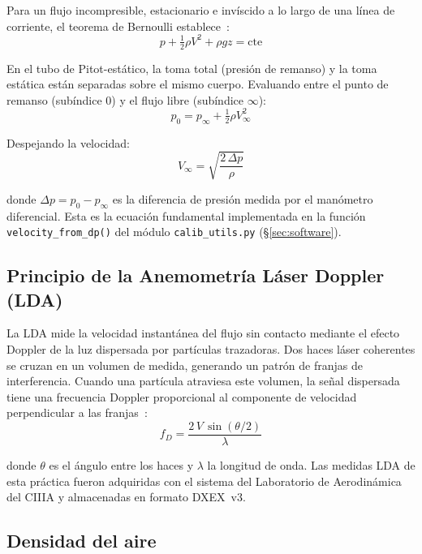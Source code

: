 \documentclass[12pt,a4paper]{article}
\begin{document}
Para un flujo incompresible, estacionario e invíscido a lo largo de una línea
de corriente, el teorema de Bernoulli establece~\cite{anderson2017}:
\begin{equation}
	p + \tfrac{1}{2}\rho V^2 + \rho g z = \text{cte}
	\label{eq:bernoulli}
\end{equation}

En el tubo de Pitot-estático, la toma total (presión de remanso) y la toma
estática están separadas sobre el mismo cuerpo.  Evaluando entre el punto de
remanso (subíndice 0) y el flujo libre (subíndice $\infty$):
\begin{equation}
	p_0 = p_\infty + \tfrac{1}{2}\rho V_\infty^2
	\label{eq:pitot_bernoulli}
\end{equation}

Despejando la velocidad:
\begin{equation}
	\boxed{V_\infty = \sqrt{\frac{2\,\Delta p}{\rho}}}
	\label{eq:V_pitot}
\end{equation}

donde $\Delta p = p_0 - p_\infty$ es la diferencia de presión medida por el
manómetro diferencial.  Esta es la ecuación fundamental implementada en la
función \texttt{velocity\_from\_dp()} del módulo \texttt{calib\_utils.py}
(§\ref{sec:software}).

\subsection{Principio de la Anemometría Láser Doppler (LDA)}

La LDA mide la velocidad instantánea del flujo sin contacto mediante el efecto
Doppler de la luz dispersada por partículas trazadoras.  Dos haces láser
coherentes se cruzan en un volumen de medida, generando un patrón de franjas de
interferencia.  Cuando una partícula atraviesa este volumen, la señal dispersada
tiene una frecuencia Doppler proporcional al componente de velocidad
perpendicular a las franjas~\cite{bruun1995,jorgensen2002}:
\begin{equation}
	f_D = \frac{2\,V\,\sin(\theta/2)}{\lambda}
	\label{eq:lda_doppler}
\end{equation}

donde $\theta$ es el ángulo entre los haces y $\lambda$ la longitud de onda.
Las medidas LDA de esta práctica fueron adquiridas con el sistema del
Laboratorio de Aerodinámica del CIIIA y almacenadas en formato DXEX~v3.

\subsection{Densidad del aire}
\end{document}
